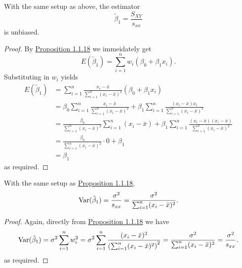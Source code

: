 \documentclass[11pt,fleqn]{book} %
\begin{document}
\begin{corollary} \label{cor:1119}
With the same setup as above, the estimator
\[
\tilde{\beta}_1 = \frac{S_{XY}}{s_{xx}}
\]
is unbiased.
\end{corollary}
\begin{proof} By \hyperref[prop:1118]{Proposition 1.1.18} we immeidately get
\[
E(\tilde{\beta}_1) = \sum_{i=1}^nw_i(\beta_0 + \beta_1x_i).
\]
Substituting in \(w_i\) yields
\[
\begin{aligned}
E(\tilde{\beta}_1) &= \sum_{i=1}^n\frac{x_i - \bar{x}}{\sum_{i=1}^n(x_i - \bar{x})^2}(\beta_0 + \beta_1x_i) \\
&= \beta_0\sum_{i=1}^n\frac{x_i - \bar{x}}{\sum_{i=1}^n(x_i - \bar{x})^2} + \beta_1\sum_{i=1}^n\frac{(x_i - \bar{x})x_i}{\sum_{i=1}^n(x_i - \bar{x})^2} \\
&= \frac{\beta_0}{\sum_{i=1}^n(x_i - \bar{x})^2}\sum_{i=1}^n(x_i - \bar{x}) + \beta_1\sum_{i=1}^n\frac{(x_i - \bar{x})(x_i - \bar{x})}{\sum_{i=1}^n(x_i - \bar{x})^2} \\
&= \frac{\beta_0}{\sum_{i=1}^n(x_i - \bar{x})^2}\cdot0 + \beta_1 \\
&= \beta_1
\end{aligned}
\]
as required.
\end{proof}

\begin{corollary} \label{cor:1120}
With the same setup as \hyperref[prop:1118]{Proposition 1.1.18}, 
\[
\operatorname{Var}(\tilde{\beta}_1) = \frac{\sigma^2}{s_{xx}} = \frac{\sigma^2}{\sum_{i=1}^n(x_i - \bar{x})^2}.
\]
\end{corollary}
\begin{proof} Again, directly from \hyperref[prop:1118]{Proposition 1.1.18} we have
\[
\operatorname{Var}(\tilde{\beta}_1) = \sigma^2\sum_{i=1}^n w_i^2 = \sigma^2\sum_{i=1}^n\frac{(x_i - \bar{x})^2}{\left(\sum_{i=1}^n (x_i - \bar{x})^2\right)^2} = \frac{\sigma^2}{\sum_{i=1}^n(x_i - \bar{x})^2} = \frac{\sigma^2}{s_{xx}}.
\]
as required.
\end{proof}
\end{document}
